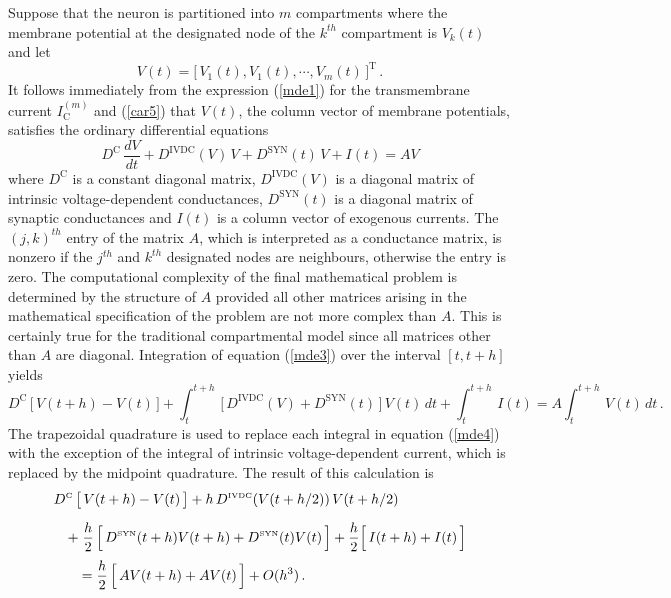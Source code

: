 Suppose that the neuron is partitioned into $m$ compartments where
the membrane potential at the designated node of the $k^{th}$
compartment is $V_k(t)$ and let
\begin{equation}\label{mde2}
V(t)=\big[\,V_1(t),V_1(t),\cdots,V_m(t)\,]^\mathrm{T}\,.
\end{equation}
It follows immediately from the expression (\ref{mde1}) for the
transmembrane current $I^{(m)}_\mathrm{C}$ and (\ref{car5}) that
$V(t)$, the column vector of membrane potentials, satisfies the
ordinary differential equations
\begin{equation}\label{mde3}
D^\mathrm{C}\,\frac{dV}{dt}+D^\mathrm{IVDC}(V)\,V+D^\mathrm{SYN}(t)\,V
+I(t)=AV
\end{equation}
where $D^\mathrm{C}$ is a constant diagonal matrix,
$D^\mathrm{IVDC}(V)$ is a diagonal matrix of intrinsic
voltage-dependent conductances, $D^\mathrm{SYN}(t)$ is a diagonal
matrix of synaptic conductances and $I(t)$ is a column vector of
exogenous currents. The $(j,k)^{th}$ entry of the matrix $A$,
which is interpreted as a conductance matrix, is nonzero if the
$j^{th}$ and $k^{th}$ designated nodes are neighbours, otherwise
the entry is zero. The computational complexity of the final
mathematical problem is determined by the structure of $A$
provided all other matrices arising in the mathematical
specification of the problem are not more complex than $A$. This
is certainly true for the traditional compartmental model since
all matrices other than $A$ are diagonal. Integration of equation
(\ref{mde3}) over the interval $[t,t+h]$ yields
\begin{equation}\label{mde4}
D^\mathrm{C}\,\big[\,V(t+h)-V(t)\,\big]+
\int_t^{t+h}\,\big[\,D^\mathrm{IVDC}(V)+
D^\mathrm{SYN}(t)\,\big]\,V(t)\,dt
+\int_t^{t+h}\,I(t)=A\int_t^{t+h}\,V(t)\,dt\,.
\end{equation}
The trapezoidal quadrature is used to replace each integral in
equation (\ref{mde4}) with the exception of the integral of
intrinsic voltage-dependent current, which is replaced by the
midpoint quadrature. The result of this calculation is
\begin{equation}\label{mde5}
\begin{array}{l}
\displaystyle D^{\mbox{\tiny C}}\,\big[\,V(t+h)-V(t)\,\big]+
h\,D^{\mbox{\tiny IVDC}}(V(t+h/2))\,V(t+h/2)\\[10pt]
\quad\displaystyle+\;\frac{h}{2}\,\Big[\,D^{\mbox{\tiny SYN}}(t+h)V(t+h)
+D^{\mbox{\tiny SYN}}(t)V(t)\,\Big]+\frac{h}{2}
\Big[\,I(t+h)+I(t)\,\Big]\\[10pt]
\qquad\displaystyle= \frac{h}{2}\,\Big[\,A V(t+h)+AV(t)\,\Big]+O(h^3)\,.
\end{array}
\end{equation}
